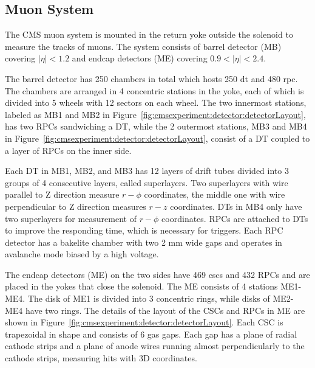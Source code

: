 \subsection{Muon System}
The CMS muon system \cite{cms:muonChamberTdr:CMS:1997iti} is mounted in the return yoke outside the solenoid to measure the tracks of muons. The system consists of barrel detector (MB) covering $|\eta|<1.2$ and endcap detectors (ME) covering $0.9 < |\eta| < 2.4$. 

The barrel detector has 250 chambers in total which hosts 250 \acrfull{dt} and 480 \acrfull{rpc}. The chambers are arranged in 4 concentric stations in the yoke, each of which is divided into 5 wheels with 12 sectors on each wheel. The two innermost stations, labeled as MB1 and MB2 in Figure~\ref{fig:cmsexperiment:detector:detectorLayout}, has two RPCs sandwiching a DT, while the 2 outermost stations, MB3 and MB4 in Figure~\ref{fig:cmsexperiment:detector:detectorLayout}, consist of a DT coupled to a layer of RPCs on the inner side. 

Each DT in MB1, MB2, and MB3 has 12 layers of drift tubes divided into 3 groups of 4 consecutive layers, called superlayers. Two superlayers with wire parallel to Z direction measure $r-\phi$ coordinates, the middle one with wire perpendicular to Z direction measures $r-z$ coordinates. DTs in MB4 only have two superlayers for measurement of $r-\phi$ coordinates. RPCs are attached to DTs to improve the responding time, which is necessary for triggers. Each RPC detector has a bakelite chamber with two 2 mm wide gaps and operates in avalanche mode biased by a high voltage. 

The endcap detectors (ME) on the two sides have 469 \acrfull{csc}s and 432 RPCs and are placed in the yokes that close the solenoid. The ME consists of 4 stations ME1-ME4. The disk of ME1 is divided into 3 concentric rings, while disks of ME2-ME4 have two rings. The details of the layout of the CSCs and RPCs in ME are shown in Figure~\ref{fig:cmsexperiment:detector:detectorLayout}. Each CSC is trapezoidal in shape and consists of 6 gas gaps. Each gap has a plane of radial cathode strips and a plane of anode wires running almost perpendicularly to the cathode strips, measuring hits with 3D coordinates.

